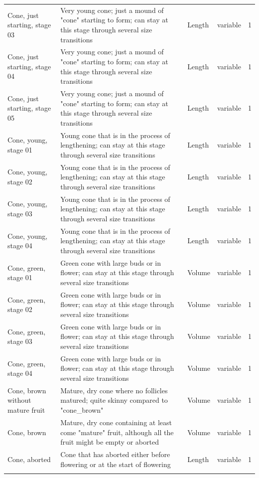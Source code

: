 \documentclass[10pt,twoside]{article}\usepackage[]{graphicx}\usepackage[]{color}
\begin{document}
\begin{longtable}{p{4.5cm}p{6cm}p{2cm}p{1cm}p{1cm}}
  Cone, just starting, stage 03 & Very young cone; just a mound of "cone" starting to form; can stay at this stage through several size transitions & Length & variable &   1 \\ 
  Cone, just starting, stage 04 & Very young cone; just a mound of "cone" starting to form; can stay at this stage through several size transitions & Length & variable &   1 \\ 
  Cone, just starting, stage 05 & Very young cone; just a mound of "cone" starting to form; can stay at this stage through several size transitions & Length & variable &   1 \\ 
  Cone, young, stage 01 & Young cone that is in the process of lengthening; can stay at this stage through several size transitions & Length & variable &   1 \\ 
  Cone, young, stage 02 & Young cone that is in the process of lengthening; can stay at this stage through several size transitions & Length & variable &   1 \\ 
  Cone, young, stage 03 & Young cone that is in the process of lengthening; can stay at this stage through several size transitions & Length & variable &   1 \\ 
  Cone, young, stage 04 & Young cone that is in the process of lengthening; can stay at this stage through several size transitions & Length & variable &   1 \\ 
  Cone, green, stage 01 & Green cone with large buds or in flower; can stay at this stage through several size transitions & Volume & variable &   1 \\ 
  Cone, green, stage 02 & Green cone with large buds or in flower; can stay at this stage through several size transitions & Volume & variable &   1 \\ 
  Cone, green, stage 03 & Green cone with large buds or in flower; can stay at this stage through several size transitions & Volume & variable &   1 \\ 
  Cone, green, stage 04 & Green cone with large buds or in flower; can stay at this stage through several size transitions & Volume & variable &   1 \\ 
  Cone, brown without mature fruit & Mature, dry cone where no follicles matured; quite skinny compared to "cone\_brown" & Volume & variable &   1 \\ 
  Cone, brown & Mature, dry cone containing at least come "mature" fruit, although all the fruit might be empty or aborted & Volume & variable &   1 \\ 
  Cone, aborted & Cone that has aborted either before flowering or at the start of flowering & Length & variable &   1 \\ 
   \hline
\hline
\label{tab:parts_Petrophile_pulchella}
\end{longtable}
\endgroup
\end{document}
